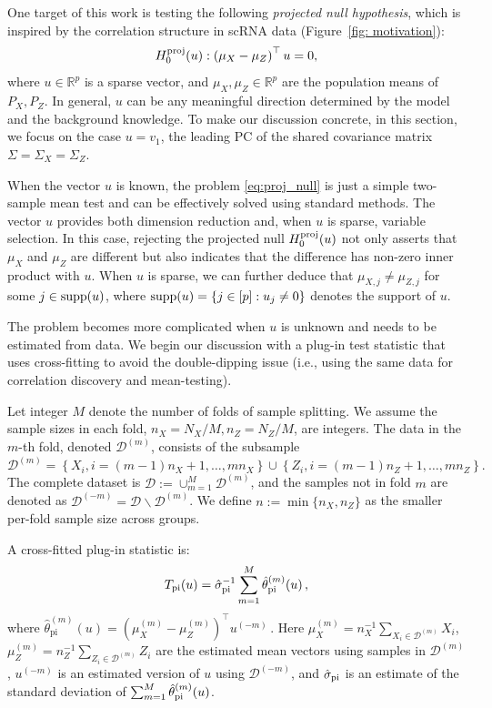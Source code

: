 \documentclass[11pt]{article}
\begin{document}
One target of this work is testing the following \emph{projected null hypothesis}, which is inspired by the correlation structure in scRNA data (Figure~\ref{fig: motivation}):
\begin{equation}\label{eq:proj_null}
H_0^{\rm proj}(u):\left(\mu_X-\mu_Z\right)^{\top} u=0,
\end{equation}
where $u\in\mathbb{R}^p$ is a sparse vector, and $\mu_X, \mu_Z \in \mathbb{R}^p$ are the population means of $P_X, P_Z$. In general, $u$ can be any meaningful direction determined by the model and the background knowledge. To make our discussion concrete, in this section, we focus on the case $u=v_1$, the leading PC of the shared covariance matrix $\Sigma=\Sigma_X=\Sigma_Z$.

When the vector $u$ is known, the problem \eqref{eq:proj_null} is just a simple two-sample mean test and can be effectively solved using standard methods. The vector $u$ provides both dimension reduction and, when $u$ is sparse, variable selection. In this case, rejecting the projected null $H_0^{\rm proj}(u)$ not only asserts that $\mu_X$ and $\mu_Z$ are different but also indicates that the difference has non-zero inner product with $u$. When $u$ is sparse, we can further deduce that $\mu_{X,j}\neq\mu_{Z,j}$ for some $j\in{\rm supp}(u)$, where ${\rm supp}(u)=\{j\in[p]:u_j\neq 0\}$ denotes the support of $u$.

The problem becomes more complicated when $u$ is unknown and needs to be estimated from data. 
We begin our discussion with a plug-in test statistic that uses cross-fitting to avoid the double-dipping issue (i.e., using the same data for correlation discovery and mean-testing).

Let integer $M$ denote the number of folds of sample splitting. We assume the sample sizes in each fold, $n_X = N_X/M, n_Z = N_Z/M$, are integers. The data in the $m$-th fold, denoted $\mathcal{D}^{(m)}$, consists of the subsample
\begin{equation*}
\mathcal{D}^{(m)}=\left\{X_i, i=(m-1) n_X+1, \ldots, m n_X\right\}\cup\left\{Z_i, i=(m-1) n_Z+1, \ldots, m n_Z\right\}.
\end{equation*}
The complete dataset is $\mathcal{D}:= \cup_{m=1}^M \mathcal{D}^{(m)}$, and the samples not in fold $m$ are denoted as $\mathcal{D}^{(-m)} = \mathcal{D} \backslash \mathcal{D}^{(m)}$. We define $n := \min\{n_X, n_Z\}$ as the smaller per-fold sample size across groups.

A cross-fitted plug-in statistic is:
\begin{equation}
\label{eq:simple statistics}
    T_{\rm pi}(u)  = \hat\sigma_{\rm pi}^{-1}\sum_{m=1}^M \hat \theta_{\rm pi}^{(m)}(u)\,,
\end{equation}
where
$
\hat{\theta}_{\mathrm{pi}}^{(m)}(u) = \left(\mu_X^{(m)}-\mu_Z^{(m)}\right)^{\top} u^{(-m)}\,.
$
Here $\mu_X^{(m)} = n_X^{-1}\sum_{X_i \in \mathcal{D}^{(m)}} X_i$, $\mu_Z^{(m)} = n_Z^{-1}\sum_{Z_i \in \mathcal{D}^{(m)}} Z_i$ are the estimated mean vectors using samples in $\mathcal{D}^{(m)}$, $u^{(-m)}$ is an estimated version of $u$ using $\mathcal{D}^{(-m)}$,
and $\hat\sigma_{\rm pi}$ is an estimate of the standard deviation of $\sum_{m=1}^M\hat\theta_{\rm pi}^{(m)}(u)$.
\end{document}
